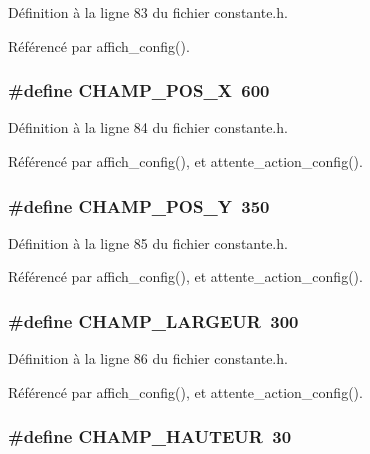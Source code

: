 D\'{e}finition \`{a} la ligne 83 du fichier constante.h.

R\'{e}f\'{e}renc\'{e} par affich\_\-config().
\subsubsection{\setlength{\rightskip}{0pt plus 5cm}\#define CHAMP\_\-POS\_\-X~600}\label{constante_8h_96726f26c036c987626c3ef397823bfd}




D\'{e}finition \`{a} la ligne 84 du fichier constante.h.

R\'{e}f\'{e}renc\'{e} par affich\_\-config(), et attente\_\-action\_\-config().
\subsubsection{\setlength{\rightskip}{0pt plus 5cm}\#define CHAMP\_\-POS\_\-Y~350}\label{constante_8h_62d4ea3868f552c9195e5650494e860c}




D\'{e}finition \`{a} la ligne 85 du fichier constante.h.

R\'{e}f\'{e}renc\'{e} par affich\_\-config(), et attente\_\-action\_\-config().
\subsubsection{\setlength{\rightskip}{0pt plus 5cm}\#define CHAMP\_\-LARGEUR~300}\label{constante_8h_23018a0f6160a4144f263e970c9c9ed0}




D\'{e}finition \`{a} la ligne 86 du fichier constante.h.

R\'{e}f\'{e}renc\'{e} par affich\_\-config(), et attente\_\-action\_\-config().
\subsubsection{\setlength{\rightskip}{0pt plus 5cm}\#define CHAMP\_\-HAUTEUR~30}\label{constante_8h_4bd4743e8296ba1d23d0a3d55db2d700}




